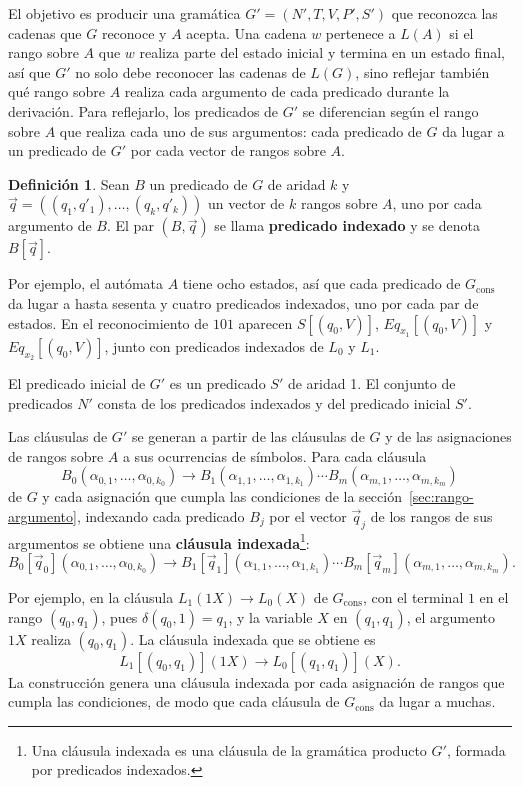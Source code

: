 \documentclass{report}
\theoremstyle{definition}
\newtheorem{definicion}{Definición}[chapter]
\theoremstyle{plain}
\begin{document}
El objetivo es producir una gramática $G' = (N', T, V, P', S')$ que
reconozca las cadenas que $G$ reconoce y $A$ acepta. Una cadena $w$
pertenece a $L(A)$ si el
rango sobre $A$ que $w$ realiza parte del estado inicial y termina en
un estado final, así que $G'$ no solo debe reconocer las cadenas de
$L(G)$, sino reflejar también qué rango sobre $A$ realiza cada
argumento de cada predicado durante la derivación. Para reflejarlo,
los predicados de $G'$ se diferencian según el rango sobre $A$ que
realiza cada uno de sus argumentos: cada predicado de $G$ da lugar a
un predicado de $G'$ por cada vector de rangos sobre $A$.

\begin{definicion}
Sean $B$ un predicado de $G$ de aridad $k$ y
$\vec q = ((q_1, q'_1), \ldots, (q_k, q'_k))$ un vector de $k$ rangos
sobre $A$, uno por cada argumento de $B$. El par $(B, \vec q)$ se
llama \textbf{predicado indexado} y se denota $B[\vec q]$.
\end{definicion}

Por ejemplo, el autómata $A$ tiene ocho estados, así que cada predicado
de $G_{\mathrm{cons}}$ da lugar a hasta sesenta y cuatro predicados
indexados, uno por cada par de estados. En el reconocimiento de $101$
aparecen $S[(q_0, V)]$,
$Eq_{x_1}[(q_0, V)]$ y $Eq_{x_2}[(q_0, V)]$, junto con predicados
indexados de $L_0$ y $L_1$.

El predicado inicial de $G'$ es un predicado $S'$ de aridad 1. El
conjunto de predicados $N'$ consta de los predicados indexados y del
predicado inicial $S'$.

Las cláusulas de $G'$ se generan a partir de las cláusulas de $G$ y de
las asignaciones de rangos sobre $A$ a sus ocurrencias de símbolos. Para
cada cláusula
\[
  B_0(\alpha_{0,1}, \ldots, \alpha_{0,k_0}) \to
  B_1(\alpha_{1,1}, \ldots, \alpha_{1,k_1}) \cdots
  B_m(\alpha_{m,1}, \ldots, \alpha_{m,k_m})
\]
de $G$ y cada asignación que cumpla las condiciones de la
sección~\ref{sec:rango-argumento}, indexando cada predicado $B_j$ por el
vector $\vec q_j$ de los rangos de sus argumentos se obtiene una
\textbf{cláusula indexada}\footnote{Una cláusula indexada es una
cláusula de la gramática producto $G'$, formada por predicados
indexados.}:
\[
  B_0[\vec q_0](\alpha_{0,1}, \ldots, \alpha_{0,k_0}) \to
  B_1[\vec q_1](\alpha_{1,1}, \ldots, \alpha_{1,k_1}) \cdots
  B_m[\vec q_m](\alpha_{m,1}, \ldots, \alpha_{m,k_m}).
\]

Por ejemplo, en la cláusula $L_1(1X) \to L_0(X)$ de $G_{\mathrm{cons}}$,
con el terminal $1$ en el rango $(q_0, q_1)$, pues $\delta(q_0, 1) = q_1$,
y la variable $X$ en $(q_1, q_1)$, el argumento $1X$ realiza $(q_0, q_1)$. La
cláusula indexada que se obtiene es
\[
  L_1[(q_0, q_1)](1X) \to L_0[(q_1, q_1)](X).
\]
La construcción genera una cláusula indexada por cada asignación de
rangos que cumpla las condiciones, de modo que cada cláusula de
$G_{\mathrm{cons}}$ da lugar a muchas.
\end{document}
